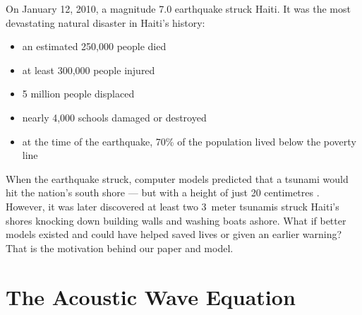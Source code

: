 \documentclass[conf]{new-aiaa}
\begin{document}
On January 12, 2010, a magnitude 7.0 earthquake struck Haiti. It was the most devastating natural disaster in Haiti's history:
\begin{itemize}
    \item an estimated 250,000 people died
    \item at least 300,000 people injured
    \item 5 million people displaced
    \item nearly 4,000 schools damaged or destroyed
    \item at the time of the earthquake, 70\% of the population lived below the poverty line \cite{haiti}
\end{itemize}
\bigskip
\par
When the earthquake struck, computer models predicted that a tsunami would hit the nation's south shore — but with a height of just 20 centimetres \cite{tsunami}. However, it was later discovered at least two \SI{3}{meter} tsunamis struck Haiti's shores knocking down building walls and washing boats ashore. What if better models existed and could have helped saved lives or given an earlier warning? That is the motivation behind our paper and model.

\section{The Acoustic Wave Equation}
\end{document}
